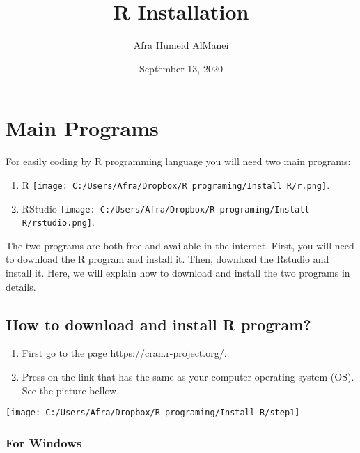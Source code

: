 \documentclass[]{article}
\title{R Installation}
\author{Afra Humeid AlManei}
\date{September 13, 2020}
\providecommand{\tightlist}{%
  \setlength{\itemsep}{0pt}\setlength{\parskip}{0pt}}
\begin{document}
\maketitle

\hypertarget{main-programs}{%
\section{\texorpdfstring{\color{blue} Main
Programs}{ Main Programs}}\label{main-programs}}

For easily coding by R programming language you will need two main
programs:

\begin{enumerate}
\def\labelenumi{\arabic{enumi}.}
\tightlist
\item
  R
  \texttt{[image: C:/Users/Afra/Dropbox/R programing/Install R/r.png]}.
\item
  RStudio
  \texttt{[image: C:/Users/Afra/Dropbox/R programing/Install R/rstudio.png]}.
\end{enumerate}

The two programs are both free and available in the internet. First, you
will need to download the R program and install it. Then, download the
Rstudio and install it. Here, we will explain how to download and
install the two programs in details.

\hypertarget{how-to-download-and-install-r-program}{%
\subsection{\texorpdfstring{\color{blue} How to download and install R
program?}{ How to download and install R program?}}\label{how-to-download-and-install-r-program}}

\begin{enumerate}
\def\labelenumi{\arabic{enumi}.}
\tightlist
\item
  First go to the page \url{https://cran.r-project.org/}.
\item
  Press on the link that has the same as your computer operating system
  (OS). See the picture bellow.
\end{enumerate}

\texttt{[image: C:/Users/Afra/Dropbox/R programing/Install R/step1]}

\hypertarget{for-windows}{%
\subsubsection{\texorpdfstring{\color{blue} For
Windows}{ For Windows}}\label{for-windows}}
\end{document}
